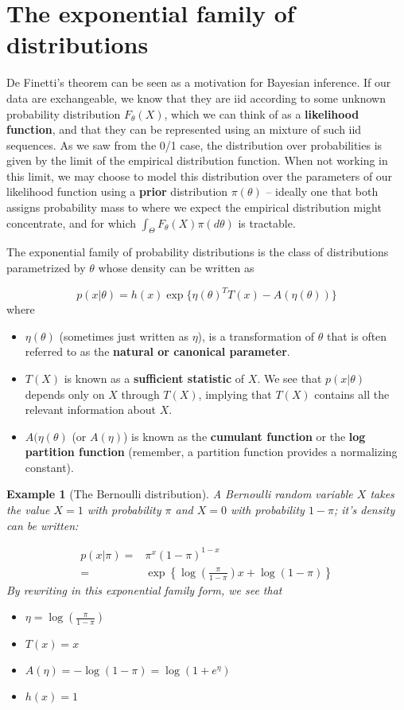 \documentclass[twoside]{article}
\newcounter{lecnum}
\newtheorem{example}{Example}[lecnum]
\begin{document}
  

\section{The exponential family of distributions}

De Finetti's theorem can be seen as a motivation for Bayesian inference. If our data are exchangeable, we know that they are iid according to some unknown probability distribution $F_\theta(X)$, which we can think of as a \textbf{likelihood function}, and that they can be represented using an mixture of such iid sequences. As we saw from the 0/1 case, the distribution over probabilities is given by the limit of the empirical distribution function. When not working in this limit, we may choose to model this distribution over the parameters of our likelihood function using a \textbf{prior} distribution $\pi(\theta)$ -- ideally one that both assigns probability mass to where we expect the empirical distribution might concentrate, and for which $\int_\Theta F_\theta(X) \pi(d\theta)$ is tractable.

The exponential family of probability distributions is the class of distributions parametrized by $\theta$ whose density can be written as

$$p(x|\theta) = h(x)\exp\{\eta(\theta)^TT(x) - A(\eta(\theta))\}$$
where 
\begin{itemize}
\item $\eta(\theta)$ (sometimes just written as $\eta$), is a transformation of $\theta$ that is often referred to as the \textbf{natural or canonical parameter}.
\item $T(X)$ is known as a \textbf{sufficient statistic} of $X$. We see that $p(x|\theta)$ depends only on $X$ through $T(X)$, implying that $T(X)$ contains all the relevant information about $X$.
\item $A(\eta(\theta)$ (or $A(\eta)$) is known as the \textbf{cumulant function} or the \textbf{log partition function} (remember, a partition function provides a normalizing constant).
\end{itemize}

\begin{example}[The Bernoulli distribution]
  A Bernoulli random variable $X$ takes the value $X=1$ with probability $\pi$ and $X=0$ with probability $1-\pi$; it's density can be written:

  $$\begin{aligned}
    p(x|\pi) =& \pi^x(1-\pi)^{1-x}\\
    =& \exp\left\{\log\left(\frac{\pi}{1-\pi}\right)x + \log(1-\pi)\right\}\end{aligned}$$
    By rewriting in this exponential family form, we see that
    \begin{itemize}
    \item $\eta = \log\left(\frac{\pi}{1-\pi}\right)$
    \item $T(x) = x$
    \item $A(\eta) = -\log(1-\pi) = \log(1+e^{\eta})$
    \item $h(x)=1$
    \end{itemize}
\end{example}
\end{document}
